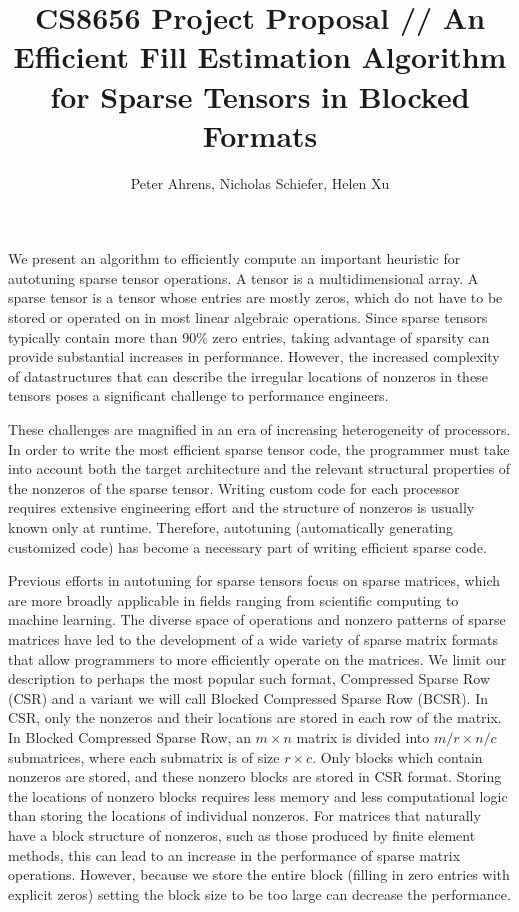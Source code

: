 \documentclass[12pt]{article}
\title{CS8656 Project Proposal // An Efficient Fill Estimation Algorithm for Sparse Tensors in Blocked Formats}
\author{Peter Ahrens, Nicholas Schiefer, Helen Xu}
\date{}
\theoremstyle{dfn}
\numberwithin{equation}{section}
\numberwithin{figure}{section}
\begin{document}
  \maketitle

  We present an algorithm to efficiently compute an important heuristic for autotuning sparse tensor operations. A tensor is a multidimensional array. A sparse tensor is a tensor whose entries are mostly zeros, which do not have to be stored or operated on in most linear algebraic operations. Since sparse tensors typically contain more than 90\% zero entries, taking advantage of sparsity can provide substantial increases in performance. However, the increased complexity of datastructures that can describe the irregular locations of nonzeros in these tensors poses a significant challenge to performance engineers.

  These challenges are magnified in an era of increasing heterogeneity of processors. In order to write the most efficient sparse tensor code, the programmer must take into account both the target architecture and the relevant structural properties of the nonzeros of the sparse tensor. Writing custom code for each processor requires extensive engineering effort and the structure of nonzeros is usually known only at runtime. Therefore, autotuning (automatically generating customized code) has become a necessary part of writing efficient sparse code.

  Previous efforts in autotuning for sparse tensors focus on sparse matrices, which are more broadly applicable in fields ranging from scientific computing to machine learning. The diverse space of operations and nonzero patterns of sparse matrices have led to the development of a wide variety of sparse matrix formats that allow programmers to more efficiently operate on the matrices. We limit our description to perhaps the most popular such format, Compressed Sparse Row (CSR) and a variant we will call Blocked Compressed Sparse Row (BCSR). In CSR, only the nonzeros and their locations are stored in each row of the matrix. In Blocked Compressed Sparse Row, an $m \times n$ matrix is divided into $m/r \times n/c$ submatrices, where each submatrix is of size $r \times c$. Only blocks which contain nonzeros are stored, and these nonzero blocks are stored in CSR format. Storing the locations of nonzero blocks requires less memory and less computational logic than storing the locations of individual nonzeros. For matrices that naturally have a block structure of nonzeros, such as those produced by finite element methods, this can lead to an increase in the performance of sparse matrix operations. However, because we store the entire block (filling in zero entries with explicit zeros) setting the block size to be too large can decrease the performance.
\end{document}
